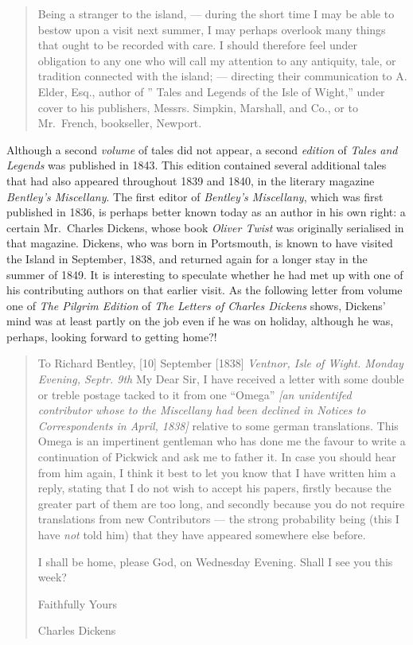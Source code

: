 \documentclass[
  12pt,
  a5paper,
  twoside]{book}
\begin{document}
\begin{quote}
Being a stranger to the island, --- during the short time I may be able
to bestow upon a visit next summer, I may perhaps overlook many things
that ought to be recorded with care. I should therefore feel under
obligation to any one who will call my attention to any antiquity, tale,
or tradition connected with the island; --- directing their
communication to A. Elder, Esq., author of '' Tales and Legends of the
Isle of Wight,'' under cover to his publishers, Messrs. Simpkin,
Marshall, and Co., or to Mr.~French, bookseller, Newport.
\end{quote}

Although a second \emph{volume} of tales did not appear, a second
\emph{edition} of \emph{Tales and Legends} was published in 1843. This
edition contained several additional tales that had also appeared
throughout 1839 and 1840, in the literary magazine \emph{Bentley's
Miscellany}. The first editor of \emph{Bentley's Miscellany}, which was
first published in 1836, is perhaps better known today as an author in
his own right: a certain Mr.~Charles Dickens, whose book \emph{Oliver
Twist} was originally serialised in that magazine. Dickens, who was born
in Portsmouth, is known to have visited the Island in September, 1838,
and returned again for a longer stay in the summer of 1849. It is
interesting to speculate whether he had met up with one of his
contributing authors on that earlier visit. As the following letter from
volume one of \emph{The Pilgrim Edition} of \emph{The Letters of Charles
Dickens} shows, Dickens' mind was at least partly on the job even if he
was on holiday, although he was, perhaps, looking forward to getting
home?!

\begin{quote}
To Richard Bentley, {[}10{]} September {[}1838{]} \emph{Ventnor, Isle of
Wight. \textbar{} Monday Evening, Septr. 9th} My Dear Sir, I have
received a letter with some double or treble postage tacked to it from
one ``Omega'' \emph{{[}an unidentifed contributor whose to the
Miscellany had been declined in Notices to Correspondents in April,
1838{]}} relative to some german translations. This Omega is an
impertinent gentleman who has done me the favour to write a continuation
of Pickwick and ask me to father it. In case you should hear from him
again, I think it best to let you know that I have written him a reply,
stating that I do not wish to accept his papers, firstly because the
greater part of them are too long, and secondly because you do not
require translations from new Contributors --- the strong probability
being (this I have \emph{not} told him) that they have appeared
somewhere else before.

I shall be home, please God, on Wednesday Evening. Shall I see you this
week?

Faithfully Yours

Charles Dickens
\end{quote}
\end{document}

